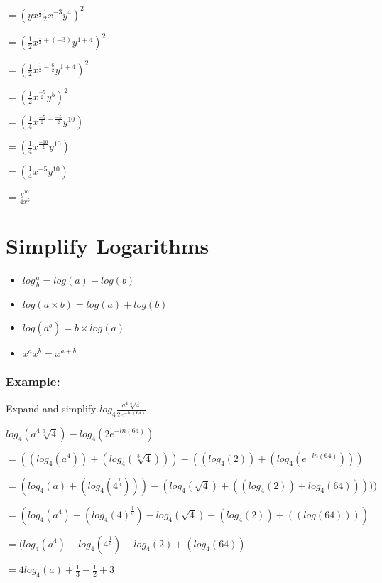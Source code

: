 \documentclass[12pt,a4paper]{article}
\begin{document}
\noindent $= (yx^{\frac{1}{2}} \frac{1}{2}x^{-3} y^4)^2$

\noindent $= (\frac{1}{2}x^{\frac{1}{2} + (-3)} y^{1+4})^2$

\noindent $= (\frac{1}{2}x^{\frac{1}{2} - \frac{6}{2}} y^{1+4})^2$

\noindent $= (\frac{1}{2}x^{\frac{-5}{2}} y^5)^2$

\noindent $= (\frac{1}{4} x^{\frac{-5}{2} + \frac{-5}{2}} y^{10})$

\noindent $= (\frac{1}{4} x^{\frac{-10}{2}} y^{10})$

\noindent $= (\frac{1}{4} x^{-5} y^{10})$

\noindent $\boxed{= \frac{y^{10}}{4 x^{5}}}$


\newpage


\section*{Simplify Logarithms}


\begin{itemize}
    \item $log \frac{a}{b} = log (a) - log (b)$
    \item $log(a \times b) = log (a) + log (b)$
    \item $log(a^b) = b \times log (a)$
    \item $x^a x^b = x^{a+b}$
\end{itemize}

\subsubsection*{Example:}

Expand and simplify $log_{4} \frac{a^4 \sqrt[3]{4}}{2e^{-ln(64)}}$

\noindent $log_{4}(a^4 \sqrt[3]{4}) - log_{4}(2e^{-ln(64)})$

\noindent $= ((log_{4}(a^4))+(log_{4}(\sqrt[3]{4}))) - ((log_4(2))+(log_{4}(e^{-ln(64)})))$

\noindent $= (log_{4}(a)+(log_{4}(4^{\frac{1}{3}}))) - (log_{4}(\sqrt{4}) + ((log_4(2)) + log_{4}(64)))))$

\noindent $= (log_{4}(a^4)+(log_{4}(4)^\frac{1}{3}) - log_{4}(\sqrt{4}) - (log_{4}(2)) + ((log(64))))$

\noindent $= (log_{4}(a^4)+ log_{4}(4^{\frac{1}{3}}) -  log_{4}(2)+ (log_{4}(64))$

\noindent $= 4log_{4}(a) + \frac{1}{3} - \frac{1}{2} + 3$
\end{document}
